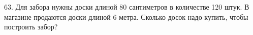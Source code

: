 63. Для забора нужны доски длиной 80 сантиметров в количестве 120 штук. В магазине продаются доски длиной 6 метра. Сколько досок надо купить, чтобы построить забор?\\
